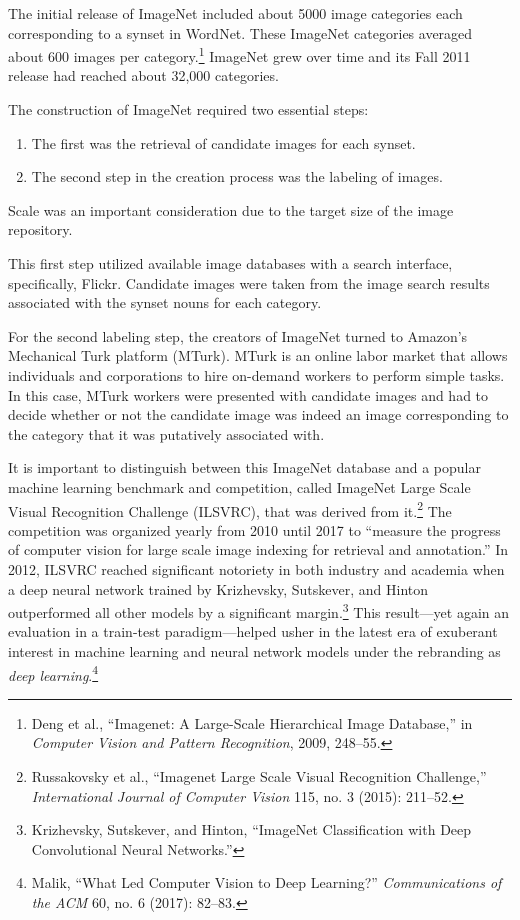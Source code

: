 \documentclass{tufte-book}
\begin{document}
The initial release of ImageNet included about 5000 image categories
each corresponding to a synset in WordNet. These ImageNet categories
averaged about 600 images per category.\footnote{Deng et al.,
  {``Imagenet: A Large-Scale Hierarchical Image Database,''} in
  \emph{Computer Vision and Pattern Recognition}, 2009, 248--55.}
ImageNet grew over time and its Fall 2011 release had reached about
32,000 categories.

The construction of ImageNet required two essential steps:

\begin{enumerate}
\def\labelenumi{\arabic{enumi}.}
\tightlist
\item
  The first was the retrieval of candidate images for each synset.
\item
  The second step in the creation process was the labeling of images.
\end{enumerate}

Scale was an important consideration due to the target size of the image
repository.

This first step utilized available image databases with a search
interface, specifically, Flickr. Candidate images were taken from the
image search results associated with the synset nouns for each category.

For the second labeling step, the creators of ImageNet turned to
Amazon's Mechanical Turk platform (MTurk). MTurk is an online labor
market that allows individuals and corporations to hire on-demand
workers to perform simple tasks. In this case, MTurk workers were
presented with candidate images and had to decide whether or not the
candidate image was indeed an image corresponding to the category that
it was putatively associated with.

It is important to distinguish between this ImageNet database and a
popular machine learning benchmark and competition, called ImageNet
Large Scale Visual Recognition Challenge (ILSVRC), that was derived from
it.\footnote{Russakovsky et al., {``Imagenet Large Scale Visual
  Recognition Challenge,''} \emph{International Journal of Computer
  Vision} 115, no. 3 (2015): 211--52.} The competition was organized
yearly from 2010 until 2017 to ``measure the progress of computer vision
for large scale image indexing for retrieval and
annotation.'' In 2012, ILSVRC reached significant
notoriety in both industry and academia when a deep neural network
trained by Krizhevsky, Sutskever, and Hinton outperformed all other
models by a significant margin.\footnote{Krizhevsky, Sutskever, and
  Hinton, {``ImageNet Classification with Deep Convolutional Neural
  Networks.''}} This result---yet again an evaluation in a train-test
paradigm---helped usher in the latest era of exuberant interest in
machine learning and neural network models under the rebranding as
\emph{deep learning}.\footnote{Malik, {``What Led Computer Vision to
  Deep Learning?''} \emph{Communications of the {ACM}} 60, no. 6 (2017):
  82--83.}
\end{document}
